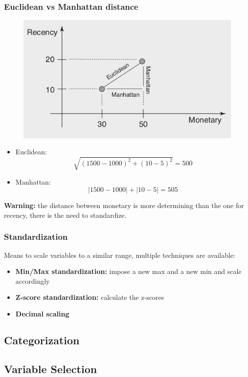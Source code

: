         \subsubsection{Euclidean vs Manhattan distance}
            \begin{figure}[ht!]
                \centering
                \includegraphics[width=0.6\linewidth]{lecture_13/distances.png}
            \end{figure}
            \begin{itemize}
                \item Euclidean: $$\sqrt{(1500-1000)^2 + (10-5)^2} = 500$$
                \item Manhattan: $$ |1500-1000| + |10-5| = 505$$
            \end{itemize}
            \textbf{Warning:} the distance between monetary is more determining than the one for recency, there is the need to standardize.
        \subsubsection{Standardization}
            Means to scale variables to a similar range, multiple techniques are available:
            \begin{itemize}
                \item \textbf{Min/Max standardization:} impose a new max and a new min and scale accordingly
                \item \textbf{Z-score standardization:} calculate the z-scores
                \item \textbf{Decimal scaling}
            \end{itemize}
    \subsection{Categorization}
        
    \subsection{Variable Selection}
